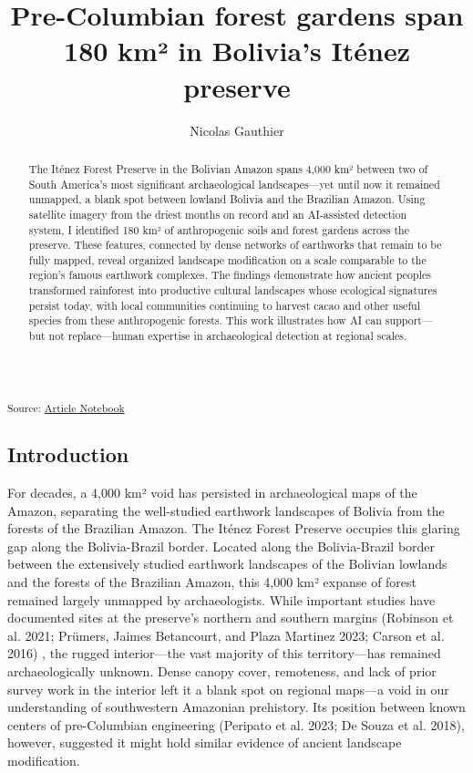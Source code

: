 \documentclass[
  letterpaper,
  DIV=11,
  numbers=noendperiod]{scrartcl}
\title{Pre-Columbian forest gardens span 180 km² in Bolivia's Iténez
preserve}
\author{Nicolas Gauthier}
\date{}
\begin{document}
\maketitle
\begin{abstract}
The Iténez Forest Preserve in the Bolivian Amazon spans 4,000 km²
between two of South America's most significant archaeological
landscapes---yet until now it remained unmapped, a blank spot between
lowland Bolivia and the Brazilian Amazon. Using satellite imagery from
the driest months on record and an AI-assisted detection system, I
identified 180 km² of anthropogenic soils and forest gardens across the
preserve. These features, connected by dense networks of earthworks that
remain to be fully mapped, reveal organized landscape modification on a
scale comparable to the region's famous earthwork complexes. The
findings demonstrate how ancient peoples transformed rainforest into
productive cultural landscapes whose ecological signatures persist
today, with local communities continuing to harvest cacao and other
useful species from these anthropogenic forests. This work illustrates
how AI can support---but not replace---human expertise in archaeological
detection at regional scales.
\end{abstract}


\textsubscript{Source:
\href{https://nick-gauthier.github.io/itenez-forest-gardens/index-preview.html}{Article
Notebook}}

\subsection{Introduction}\label{introduction}

For decades, a 4,000 km² void has persisted in archaeological maps of
the Amazon, separating the well-studied earthwork landscapes of Bolivia
from the forests of the Brazilian Amazon. The Iténez Forest Preserve
occupies this glaring gap along the Bolivia-Brazil border. Located along
the Bolivia-Brazil border between the extensively studied earthwork
landscapes of the Bolivian lowlands and the forests of the Brazilian
Amazon, this 4,000 km² expanse of forest remained largely unmapped by
archaeologists. While important studies have documented sites at the
preserve's northern and southern margins (Robinson et al. 2021; Prümers,
Jaimes Betancourt, and Plaza Martinez 2023; Carson et al. 2016) , the
rugged interior---the vast majority of this territory---has remained
archaeologically unknown. Dense canopy cover, remoteness, and lack of
prior survey work in the interior left it a blank spot on regional
maps---a void in our understanding of southwestern Amazonian prehistory.
Its position between known centers of pre-Columbian engineering
(Peripato et al. 2023; De Souza et al. 2018), however, suggested it
might hold similar evidence of ancient landscape modification.
\end{document}
